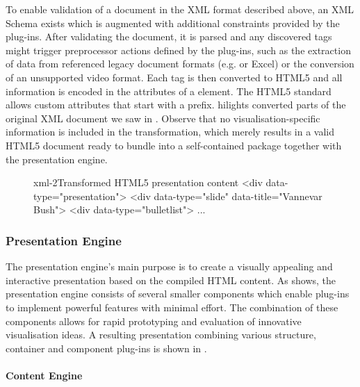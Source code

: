      To enable validation of a \mxp document in the XML format described above,
     an XML Schema exists which is augmented with additional constraints
     provided by the plug-ins. After validating the document, it is parsed and
     any discovered tags might trigger preprocessor actions defined by the
     plug-ins, such as the extraction of data from referenced legacy document
     formats (e.g. \ppt or Excel) or the conversion of an unsupported video
     format. Each tag is then converted to HTML5 and all information is encoded
     in the attributes of a  element. The HTML5 standard allows
     custom attributes that start with a  prefix. 
     hilights converted parts of the original XML document we saw in
     . Observe that no visualisation-specific information is
     included in the transformation, which merely results in a valid HTML5
     document ready to bundle into a self-contained package together with the
     presentation engine.

     \begin{figure}[h!]
      \begin{lstxml}{xml-2}{Transformed HTML5 presentation content}
<div data-type="presentation">
  <div data-type="slide" data-title="Vannevar Bush">
    <div data-type="bulletlist">
      ...
      \end{lstxml}
     \end{figure}

    \subsubsection{Presentation Engine}

     The presentation engine's main purpose is to create a visually appealing
     and interactive presentation based on the compiled HTML content. As
      shows, the presentation engine consists of several
     smaller components which enable plug-ins to implement powerful features
     with minimal effort. The combination of these components allows for rapid
     prototyping and evaluation of innovative visualisation ideas. A resulting
     \mxp presentation combining various structure, container and component
     plug-ins is shown in .


     \paragraph{Content Engine}
     
